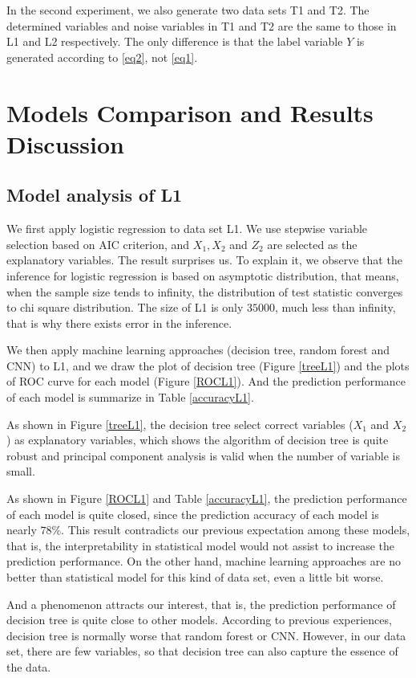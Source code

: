 \documentclass[12pt]{article}
\begin{document}
In the second experiment, we also generate two data sets T1 and T2. The determined variables and noise variables in T1 and T2 are the same to those in L1 and L2 respectively. The only difference is that the label variable $Y$ is generated according to \eqref{eq2}, not \eqref{eq1}.

\section{Models Comparison and Results Discussion}
\subsection{Model analysis of L1}
We first apply logistic regression to data set L1. We use stepwise variable selection based on AIC criterion, and $X_1, X_2$ and $Z_2$ are selected as the explanatory variables. The result surprises us. To explain it, we observe that the inference for logistic regression is based on asymptotic distribution, that means, when the sample size tends to infinity, the distribution of test statistic converges to chi square distribution. The size of L1 is only $35000$, much less than infinity, that is why there exists error in the inference.

We then apply machine learning approaches (decision tree, random forest and CNN) to L1, and we draw the plot of decision tree (Figure \ref{treeL1}) and the plots of ROC curve for each model (Figure \ref{ROCL1}). And the prediction performance of each model is summarize in Table \ref{accuracyL1}.

As shown in Figure \ref{treeL1}, the decision tree select correct variables ($X_1$ and $X_2$) as explanatory variables, which shows the algorithm of decision tree is quite robust and principal component analysis is valid when the number of variable is small.

As shown in Figure \ref{ROCL1} and Table \ref{accuracyL1}, the prediction performance of each model is quite closed, since the prediction accuracy of each model is nearly $78\%$. This result contradicts our previous expectation among these models, that is, the interpretability in statistical model would not assist to increase the prediction performance. On the other hand, machine learning approaches are no better than statistical model for this kind of data set, even a little bit worse.

And a phenomenon attracts our interest, that is, the prediction performance of decision tree is quite close to other models. According to previous experiences, decision tree is normally worse that random forest or CNN. However, in our data set, there are few variables, so that decision tree can also capture the essence of the data. 
\end{document}
